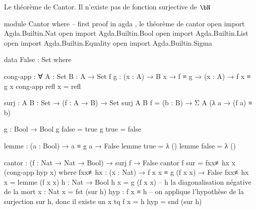 \documentclass{article}
\begin{document}
Le théorème de Cantor.
Il n'existe pas de fonction surjective de $\bN $
\begin{code}[cantor]
module Cantor  where
-- first proof in agda , le théorème de cantor
open import Agda.Builtin.Nat
open import Agda.Builtin.Bool
open import Agda.Builtin.List
open import Agda.Builtin.Equality
open import Agda.Builtin.Sigma

data False : Set where

cong-app : ∀ {A : Set } {B : A → Set } {f g : (x : A) → B x} →
           f ≡ g → (x : A) → f x ≡ g x
cong-app refl x = refl

surj : {A B : Set} → (f : A → B) → Set
surj  {A} {B} f =  (b : B) → Σ A (λ a → (f a) ≡ b)

g : Bool → Bool
g false = true
g true = false

lemme : (a : Bool) → a ≡ g a → False
lemme true = λ ()  
lemme false = λ ()  

cantor : (f : Nat → Nat → Bool) → surj f → False
cantor f sur = fxx≢hx x (cong-app hyp x) 
  where 
  fxx≢hx : (x : Nat) → f x x ≡ g (f x x) → False
  fxx≢hx x = lemme (f x x)
  h : Nat → Bool
  h x = g (f x x) -- h la diagonalisation négative de la mort
  x : Nat
  x = fst (sur h)
  hyp : f x ≡ h     -- on applique l'hypothèse de la surjection sur h, donc il existe un x tq f x = h
  hyp = snd (sur h)
  
\end{code}
\end{document}
